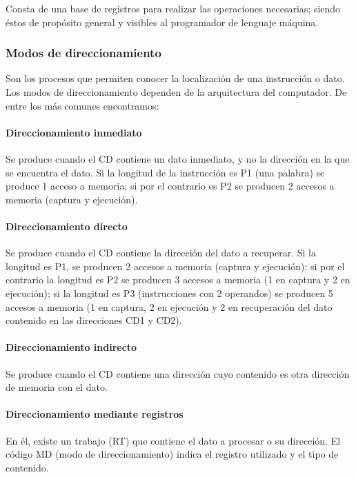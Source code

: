 \documentclass[a4paper, 11pt, titlepage]{article}
\begin{document}
        Consta de una base de registros para realizar las operaciones necesarias; siendo éstos de propósito general 
        y visibles al programador de lenguaje máquina.

        \subsubsection{Modos de direccionamiento}

            Son los procesos que permiten conocer la localización de una instrucción o dato. Los modos de direccionamiento 
            dependen de la arquitectura del computador. De entre los más comunes encontramos:

            \paragraph{Direccionamiento inmediato} Se produce cuando el CD contiene un dato inmediato, y no la 
            dirección en la que se encuentra el dato. Si la longitud de la instrucción es P1 (una palabra) se produce 
            1 acceso a memoria; si por el contrario es P2 se producen 2 accesos a memoria (captura y ejecución).

            \paragraph{Direccionamiento directo} Se produce cuando el CD contiene la dirección del dato a recuperar.
            Si la longitud es P1, se producen 2 accesos a memoria (captura y ejecución); si por el contrario 
            la longitud es P2 se producen 3 accesos a memoria (1 en captura y 2 en ejecución); si la longitud es P3 
            (instrucciones con 2 operandos) se producen 5 accesos a memoria (1 en captura, 2 en ejecución y 2 en 
            recuperación del dato contenido en las direcciones CD1 y CD2).

            \paragraph{Direccionamiento indirecto} Se produce cuando el CD contiene una dirección cuyo contenido es otra 
            dirección de memoria con el dato.

            \paragraph{Direccionamiento mediante registros} En él, existe un trabajo (RT) que contiene el dato a procesar 
            o su dirección. El código MD (modo de direccionamiento) indica el registro utilizado y el tipo de contenido.
\end{document}
